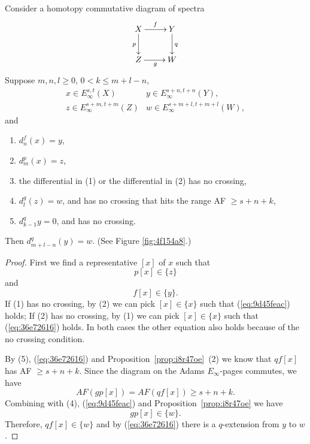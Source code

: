 \documentclass{amsart}
\numberwithin{equation}{section}
\begin{document}
 


\begin{theorem}\label{thm:4114f70c}
    Consider a homotopy commutative diagram of spectra
    $$\xymatrix{
    X \ar[r]^{f}\ar[d]_{p} & Y\ar[d]^{q}\\
    Z \ar[r]_{g} & W
    }$$
    Suppose $m,n,l\ge 0$, $0<k\le m+l-n$,
    $$\begin{array}{ll}
        x\in E^{s,t}_\infty(X) & y\in E^{s+n,t+n}_\infty(Y),\\
        z\in E^{s+m,t+m}_\infty(Z) & w\in E^{s+m+l,t+m+l}_\infty(W),
    \end{array}$$
    and
    \begin{enumerate}
        \item $d^{f}_{n}(x)=y$,
        \item $d^{p}_{m}(x)=z$,
        \item the differential in (1) or the differential in (2) has no crossing,
        \item $d^{g}_{l}(z)=w$, and has no crossing that hits the range AF $\ge s+n+k$,
        \item $d^{q}_{k-1} y=0$, and has no crossing.
    \end{enumerate}
    Then $d^{q}_{m+l-n}(y)=w$. (See Figure \ref{fig:4f154a8}.)
\end{theorem}

\begin{proof}
    First we find a representative $[x]$ of $x$ such that
    \begin{equation}\label{eq:9d45feac}
        p[x]\in \{z\}
    \end{equation}
    and
    \begin{equation}\label{eq:36e72616}
        f[x]\in \{y\}.
    \end{equation}
    If (1) has no crossing, by (2) we can pick $[x]\in \{x\}$ such that (\ref{eq:9d45feac}) holds;
    If (2) has no crossing, by (1) we can pick $[x]\in \{x\}$ such that  (\ref{eq:36e72616}) holds.
    In both cases the other equation also holds because of the no crossing condition.
    
    By (5), (\ref{eq:36e72616}) and Proposition~\ref{prop:i8r47oe}~(2) we know that $qf[x]$ has AF $\ge s+n+k$. Since the diagram on the Adams $E_\infty$-pages commutes, we have
    $$AF(gp[x])=AF(qf[x])\ge s+n+k.$$
    Combining with (4), (\ref{eq:9d45feac}) and Proposition~\ref{prop:i8r47oe} we have
    $$gp[x]\in \{w\}.$$
    Therefore, $qf[x]\in \{w\}$ and by (\ref{eq:36e72616}) there is a $q$-extension from $y$ to $w$.
\end{proof}
\end{document}
